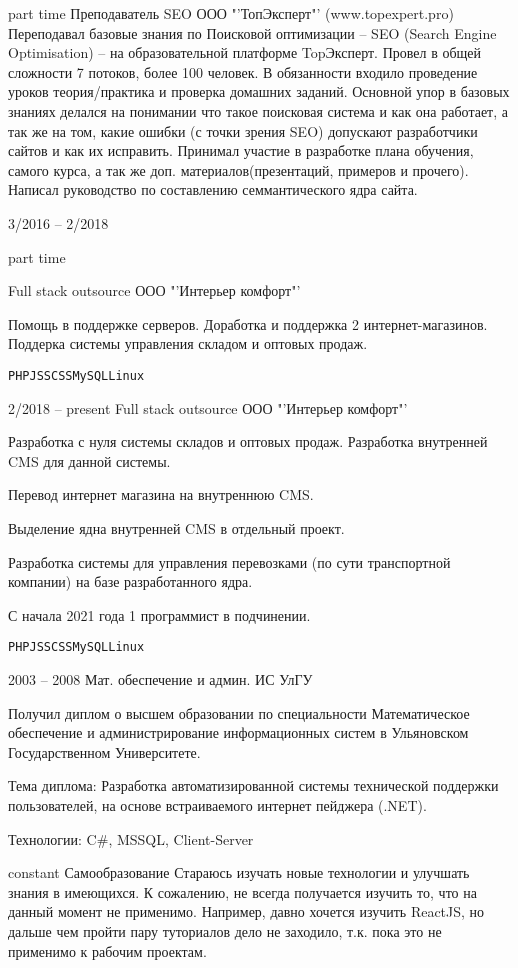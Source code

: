 \documentclass[10pt]{tpl/developercv} %
\begin{document}
\begin{entrylist}
{		\footnotesize{part time}}
		{Преподаватель SEO}
		{ООО "'ТопЭксперт"' (www.topexpert.pro)}
		{Переподавал базовые знания по Поисковой оптимизации -- SEO (Search Engine Optimisation) -- на образовательной платформе TopЭксперт. Провел в общей сложности 7 потоков, более 100 человек. В обязанности входило проведение уроков теория/практика и проверка домашних заданий. Основной упор в базовых знаниях делался на понимании что такое поисковая система и как она работает, а так же на том, какие ошибки (с точки зрения SEO) допускают разработчики сайтов и как их исправить. Принимал участие в разработке плана обучения, самого курса, а так же доп. материалов(презентаций, примеров и прочего). Написал руководство по составлению семмантического ядра сайта.}
	\entry
		{3/2016 -- 2/2018

		\footnotesize{part time}}
		{Full stack outsource}
		{ООО "'Интерьер комфорт"' }
		{Помощь в поддержке серверов. Доработка и поддержка 2 интернет-магазинов. Поддерка системы управления складом и оптовых продаж.

		\texttt{PHP}\slashsep\texttt{JS}\slashsep\texttt{SCSS}\slashsep\texttt{MySQL}\slashsep\texttt{Linux}}
	\entry
		{2/2018 -- present}
		{Full stack outsource}
		{ООО "'Интерьер комфорт"' }
		{Разработка с нуля системы складов и оптовых продаж. Разработка внутренней CMS для данной системы.

		Перевод интернет магазина на внутреннюю CMS.

		Выделение ядна внутренней CMS в отдельный проект.

		Разработка системы для управления перевозками (по сути транспортной компании) на базе разработанного ядра.

		С начала 2021 года 1 программист в подчинении.

		\texttt{PHP}\slashsep\texttt{JS}\slashsep\texttt{SCSS}\slashsep\texttt{MySQL}\slashsep\texttt{Linux}}
\end{entrylist}



\begin{entrylist}
	\entry
		{2003 -- 2008}
		{Мат. обеспечение и админ. ИС}
		{УлГУ}
		{Получил диплом о высшем образовании по специальности Математическое обеспечение и администрирование информационных систем в Ульяновском Государственном Университете.

		Тема диплома: Разработка автоматизированной системы технической поддержки пользователей, на основе встраиваемого интернет пейджера (.NET).

		Технологии: C\#, MSSQL, Client-Server
		}
	\entry
		{constant}
		{Самообразование}
		{}
		{Стараюсь изучать новые технологии и улучшать знания в имеющихся. К сожалению, не всегда получается изучить то, что на данный момент не применимо. Например, давно хочется изучить ReactJS, но дальше чем пройти пару туториалов дело не заходило, т.к. пока это не применимо к рабочим проектам.}
\end{entrylist}
\end{document}
